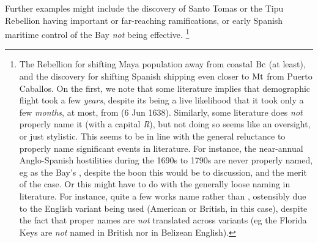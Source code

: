 		Further examples might include the discovery of Santo Tomas or the Tipu Rebellion having important or far-reaching ramifications, or early Spanish maritime control of the Bay \emph{not} being effective.%
		\footnote{The Rebellion for shifting Maya population away from coastal \(\operatorname{Bc}\) (at least), and the discovery for shifting Spanish shipping even closer to \(\operatorname{Mt}\) from Puerto Caballos. On the first, we note that some literature implies that demographic flight took a few \emph{years}, despite its being a live likelihood that it took only a few \emph{months}, at most, from  (6 Jun 1638). Similarly, some literature does \emph{not} properly name it (with a capital \emph{R}), but not doing so seems like an oversight, or just stylistic. This seems to be in line with the general reluctance to properly name significant events in literature. For instance, the near-annual Anglo-Spanish hostilities during the 1690s to 1790s are never properly named, eg as the Bay's , despite the boon this would be to discussion, and the merit of the case. Or this might have to do with the generally loose naming in literature. For instance, quite a few works name  rather than , ostensibly due to the English variant being used (American or British, in this case), despite the fact that proper names are \emph{not} translated across variants (eg the Florida Keys are \emph{not} named  in British nor  in Belizean English).}

